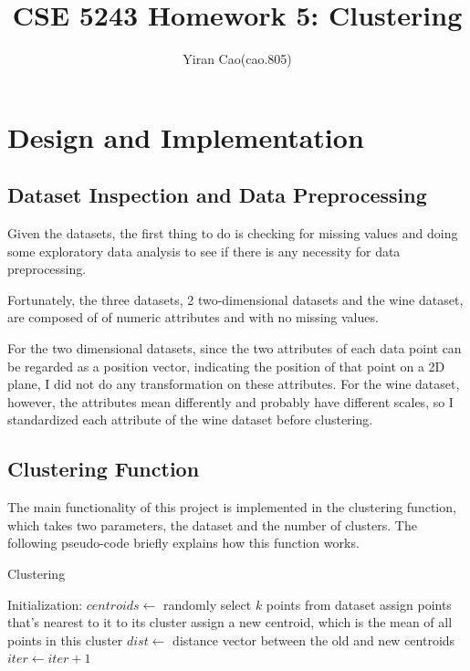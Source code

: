 \documentclass{article}
\title{CSE 5243 Homework 5: Clustering}
\author{Yiran Cao(cao.805)}
\date{}
\begin{document}
\maketitle
\section{Design and Implementation}
	\subsection{Dataset Inspection and Data Preprocessing}
	Given the datasets, the first thing to do is checking for missing values and doing some exploratory data analysis to see if there is any necessity for data preprocessing.

	Fortunately, the three datasets, 2 two-dimensional datasets and the wine dataset, are composed of of numeric attributes and with no missing values.

	For the two dimensional datasets, since the two attributes of each data point can be regarded as a position vector, indicating the position of that point on a 2D plane, I did not do any transformation on these attributes. For the wine dataset, however, the attributes mean differently and probably have different scales, so I standardized each attribute of the wine dataset before clustering.

	\subsection{Clustering Function}
	The main functionality of this project is implemented in the clustering function, which takes two parameters, the dataset and the number of clusters. The following pseudo-code briefly explains how this function works.

	\begin{algorithm}
	\caption{Clustering}\label{alg:cluster}
		\begin{algorithmic}
			\State Initialization:
			\State $centroids \gets $ randomly select $k$ points from dataset
					\State assign points that's nearest to it to its cluster
				\EndFor
					\State assign a new centroid, which is the mean of all points in this cluster
				\EndFor
				\State $dist \gets $ distance vector between the old and new centroids
				\State $iter \gets iter + 1$
			\EndWhile
		\EndProcedure
		\end{algorithmic}
	\end{algorithm}
\end{document}

